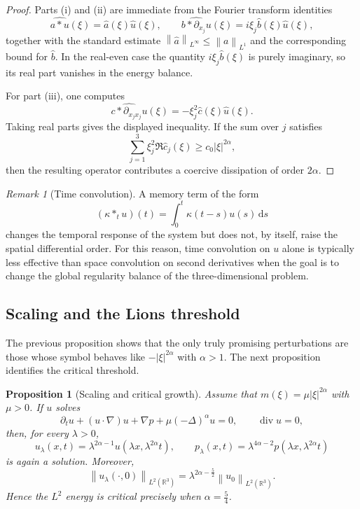 \documentclass[11pt]{article}
\newtheorem{proposition}[theorem]{Proposition}
\theoremstyle{definition}
\theoremstyle{remark}
\newtheorem{remark}[theorem]{Remark}
\newcommand{\R}{\mathbb{R}}
\newcommand{\dd}{\,\mathrm{d}}
\newcommand{\norm}[1]{\left\lVert #1\right\rVert}
\newcommand{\diver}{\operatorname{div}}
\begin{document}
\begin{proof}
Parts (i) and (ii) are immediate from the Fourier transform identities
\[
\widehat{a*u}(\xi)=\hat a(\xi)\hat u(\xi),
\qquad
\widehat{b*\partial_{x_j}u}(\xi)=i\xi_j \hat b(\xi)\hat u(\xi),
\]
together with the standard estimate $\norm{\hat a}_{L^\infty}\le \norm{a}_{L^1}$ and the corresponding bound for $\hat b$. In the real-even case the quantity $i\xi_j\hat b(\xi)$ is purely imaginary, so its real part vanishes in the energy balance.

For part (iii), one computes
\[
\widehat{c*\partial_{x_jx_j}u}(\xi)
=
-\xi_j^2 \hat c(\xi)\hat u(\xi).
\]
Taking real parts gives the displayed inequality. If the sum over $j$ satisfies
\[
\sum_{j=1}^3 \xi_j^2 \Re \hat c_j(\xi)\ge c_0 |\xi|^{2\alpha},
\]
then the resulting operator contributes a coercive dissipation of order $2\alpha$.
\end{proof}

\begin{remark}[Time convolution]
A memory term of the form
\[
(\kappa *_t u)(t)=\int_0^t \kappa(t-s)u(s)\dd s
\]
changes the temporal response of the system but does not, by itself, raise the spatial differential order. For this reason, time convolution on $u$ alone is typically less effective than space convolution on second derivatives when the goal is to change the global regularity balance of the three-dimensional problem.
\end{remark}

\subsection{Scaling and the Lions threshold}

The previous proposition shows that the only truly promising perturbations are those whose symbol behaves like $-|\xi|^{2\alpha}$ with $\alpha>1$. The next proposition identifies the critical threshold.

\begin{proposition}[Scaling and critical growth]\label{prop:scaling}
Assume that $m(\xi)=\mu |\xi|^{2\alpha}$ with $\mu>0$. If $u$ solves
\[
\partial_t u + (u\cdot\nabla)u + \nabla p + \mu (-\Delta)^\alpha u = 0,
\qquad \diver u=0,
\]
then, for every $\lambda>0$,
\[
u_\lambda(x,t)=\lambda^{2\alpha-1}u(\lambda x,\lambda^{2\alpha}t),
\qquad
p_\lambda(x,t)=\lambda^{4\alpha-2}p(\lambda x,\lambda^{2\alpha}t)
\]
is again a solution. Moreover,
\[
\norm{u_\lambda(\cdot,0)}_{L^2(\R^3)}
=
\lambda^{2\alpha-\frac52}\norm{u_0}_{L^2(\R^3)}.
\]
Hence the $L^2$ energy is critical precisely when $\alpha=\frac54$.
\end{proposition}
\end{document}
